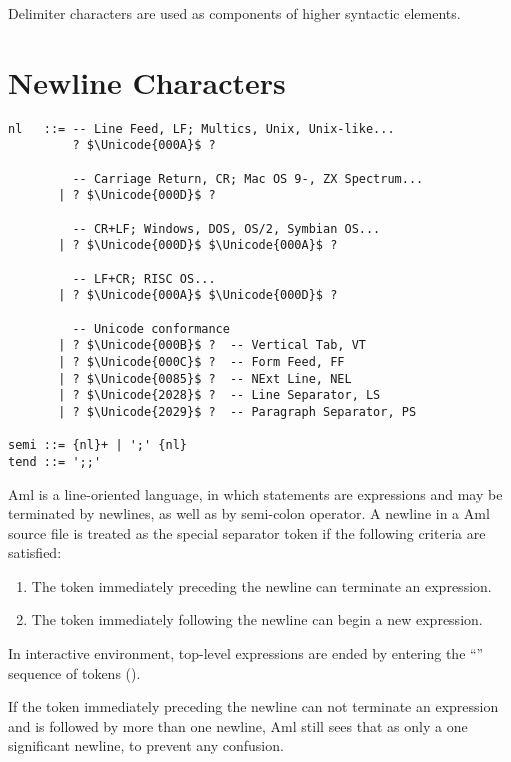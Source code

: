 Delimiter characters are used as components of higher syntactic elements. 





\section{Newline Characters}
\label{sec:newlinecharacters}

\syntax\begin{lstlisting}
nl   ::= -- Line Feed, LF; Multics, Unix, Unix-like... 
         ? $\Unicode{000A}$ ? 
         
         -- Carriage Return, CR; Mac OS 9-, ZX Spectrum...
       | ? $\Unicode{000D}$ ? 
       
         -- CR+LF; Windows, DOS, OS/2, Symbian OS...
       | ? $\Unicode{000D}$ $\Unicode{000A}$ ?
       
         -- LF+CR; RISC OS...
       | ? $\Unicode{000A}$ $\Unicode{000D}$ ?
       
         -- Unicode conformance
       | ? $\Unicode{000B}$ ?  -- Vertical Tab, VT
       | ? $\Unicode{000C}$ ?  -- Form Feed, FF
       | ? $\Unicode{0085}$ ?  -- NExt Line, NEL
       | ? $\Unicode{2028}$ ?  -- Line Separator, LS
       | ? $\Unicode{2029}$ ?  -- Paragraph Separator, PS
       
semi ::= {nl}+ | ';' {nl}
tend ::= ';;'
\end{lstlisting}

Aml is a line-oriented language, in which statements are expressions and may be terminated by newlines, as well as by semi-colon operator. A newline in a Aml source file is treated as the special separator token \lstinline@nl@ if the following criteria are satisfied:

\begin{enumerate}
  \item The token immediately preceding the newline can terminate an expression.
  \item The token immediately following the newline can begin a new expression. 
\end{enumerate}

In interactive environment, top-level expressions are ended by entering the ``\code{;;}'' sequence of tokens (). 

If the token immediately preceding the newline can not terminate an expression and is followed by more than one newline, Aml still sees that as only a one significant newline, to prevent any confusion.

